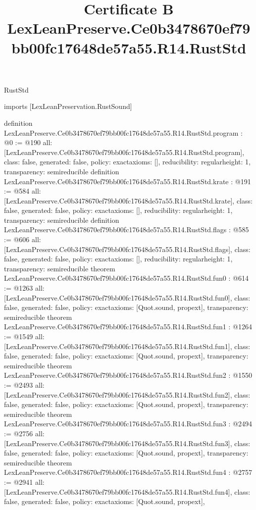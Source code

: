\begin{lexlean}{RustStd}
\title{Certificate B LexLeanPreserve.Ce0b3478670ef79bb00fc17648de57a55.R14.RustStd}
\begin{coremodule}
imports [LexLeanPreservation.RustSound]

definition LexLeanPreserve.Ce0b3478670ef79bb00fc17648de57a55.R14.RustStd.program : @0 := @190 {
  all: [LexLeanPreserve.Ce0b3478670ef79bb00fc17648de57a55.R14.RustStd.program],
  class: false,
  generated: false,
  policy: exact{axioms: []},
  reducibility: regular{height: 1},
  transparency: semireducible
}
definition LexLeanPreserve.Ce0b3478670ef79bb00fc17648de57a55.R14.RustStd.krate : @191 := @584 {
  all: [LexLeanPreserve.Ce0b3478670ef79bb00fc17648de57a55.R14.RustStd.krate],
  class: false,
  generated: false,
  policy: exact{axioms: []},
  reducibility: regular{height: 1},
  transparency: semireducible
}
definition LexLeanPreserve.Ce0b3478670ef79bb00fc17648de57a55.R14.RustStd.flags : @585 := @606 {
  all: [LexLeanPreserve.Ce0b3478670ef79bb00fc17648de57a55.R14.RustStd.flags],
  class: false,
  generated: false,
  policy: exact{axioms: []},
  reducibility: regular{height: 1},
  transparency: semireducible
}
theorem LexLeanPreserve.Ce0b3478670ef79bb00fc17648de57a55.R14.RustStd.fun0 : @614 := @1263 {
  all: [LexLeanPreserve.Ce0b3478670ef79bb00fc17648de57a55.R14.RustStd.fun0],
  class: false,
  generated: false,
  policy: exact{axioms: [Quot.sound, propext]},
  transparency: semireducible
}
theorem LexLeanPreserve.Ce0b3478670ef79bb00fc17648de57a55.R14.RustStd.fun1 : @1264 := @1549 {
  all: [LexLeanPreserve.Ce0b3478670ef79bb00fc17648de57a55.R14.RustStd.fun1],
  class: false,
  generated: false,
  policy: exact{axioms: [Quot.sound, propext]},
  transparency: semireducible
}
theorem LexLeanPreserve.Ce0b3478670ef79bb00fc17648de57a55.R14.RustStd.fun2 : @1550 := @2493 {
  all: [LexLeanPreserve.Ce0b3478670ef79bb00fc17648de57a55.R14.RustStd.fun2],
  class: false,
  generated: false,
  policy: exact{axioms: [Quot.sound, propext]},
  transparency: semireducible
}
theorem LexLeanPreserve.Ce0b3478670ef79bb00fc17648de57a55.R14.RustStd.fun3 : @2494 := @2756 {
  all: [LexLeanPreserve.Ce0b3478670ef79bb00fc17648de57a55.R14.RustStd.fun3],
  class: false,
  generated: false,
  policy: exact{axioms: [Quot.sound, propext]},
  transparency: semireducible
}
theorem LexLeanPreserve.Ce0b3478670ef79bb00fc17648de57a55.R14.RustStd.fun4 : @2757 := @2941 {
  all: [LexLeanPreserve.Ce0b3478670ef79bb00fc17648de57a55.R14.RustStd.fun4],
  class: false,
  generated: false,
  policy: exact{axioms: [Quot.sound, propext]},
}
\end{coremodule}
\end{lexlean}
